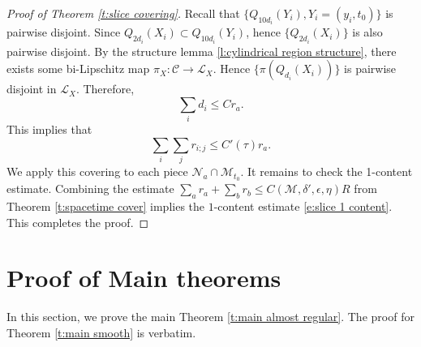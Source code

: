 \documentclass[11pt,reqno]{amsart}
\numberwithin{equation}{section}
\newcommand{\cC}{\mathcal{C}}
\newcommand{\cL}{\mathcal{L}}
\newcommand{\cM}{\mathcal{M}}
\newcommand{\cN}{\mathcal{N}}
\theoremstyle{definition}
\theoremstyle{remark}
\theoremstyle{remark}
\theoremstyle{remark}
\theoremstyle{remark}\newtheorem{conjecture}[equation]{Conjecture}
\theoremstyle{remark}\newtheorem{question}[equation]{Question}
\begin{document}
\begin{proof}[Proof of Theorem \ref{t:slice covering}]
Recall that $\{Q_{10d_i}(Y_i),Y_i=(y_i,t_0)\}$ is pairwise disjoint. Since $Q_{2d_i}(X_i) \subset Q_{10d_i}(Y_i)$, hence $\{Q_{2d_i}(X_i)\}$ is also pairwise disjoint. By the structure lemma \ref{l:cylindrical region structure}, there exists some bi-Lipschitz map $\pi_X : \cC \to \cL_X$. Hence $\{\pi(Q_{d_i}(X_i))\}$ is pairwise disjoint in $\cL_X$. Therefore,
\begin{equation*}
    \sum_{i} d_i \le  C r_a.  
\end{equation*}
This implies that
\begin{equation*}
    \sum_i \sum_j r_{i;j} \le C'(\tau) r_a.
\end{equation*}
We apply this covering to each piece $\cN_a\cap \cM_{t_0}$. It remains to check the 1-content estimate. Combining the estimate $\sum_a r_a + \sum_b r_b \le C(\cM,\delta',\epsilon,\eta)R$ from Theorem \ref{t:spacetime cover} implies the $1$-content estimate \eqref{e:slice 1 content}. This completes the proof.
\end{proof}











\section{Proof of Main theorems}

In this section, we prove the main Theorem \ref{t:main almost regular}. The proof for Theorem \ref{t:main smooth} is verbatim.  
\end{document}

